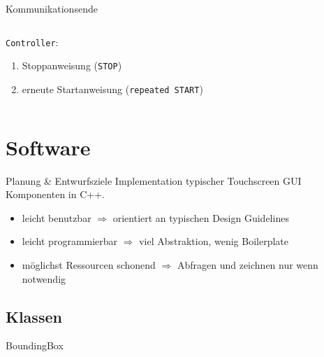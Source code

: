 \documentclass[12pt]{beamer}
\begin{document}
	\begin{frame}{Kommunikationsende}
		\begin{columns}
			\begin{column}{0.55\textwidth}
				\texttt{Controller}:
				\begin{enumerate}[a]
					\item Stoppanweisung (\texttt{STOP})
					\item erneute Startanweisung (\texttt{repeated START})
				\end{enumerate}
			\end{column}
			\begin{column}{0.4\textwidth}
				\begin{figure}
					
				\end{figure}
				\begin{figure}
					
				\end{figure}
			\end{column}
		\end{columns}
	\end{frame}
	
	\section{Software}
	\frame{\tableofcontents[currentsection]}
	
	\begin{frame}{Planung \& Entwurfsziele}
		Implementation typischer Touchscreen GUI Komponenten in C++.
		\pause
		\bigskip
		\begin{itemize}
			\item leicht benutzbar $\Rightarrow$ orientiert an typischen Design Guidelines \cite{material-components} \pause
			\item leicht programmierbar $\Rightarrow$ viel Abstraktion, wenig Boilerplate \pause
			\item möglichst Ressourcen schonend $\Rightarrow$ Abfragen und zeichnen nur wenn notwendig
		\end{itemize}
	\end{frame}
	
	\subsection{Klassen}
	\begin{frame}{BoundingBox}
		\centering
		\begin{tikzpicture}
			
		\end{tikzpicture}
	\end{frame}
	
\end{document}
